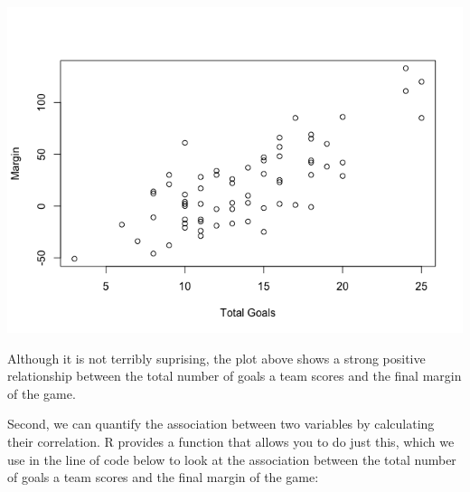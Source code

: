 \documentclass[
]{article}
\newenvironment{Shaded}{\begin{snugshade}}{\end{snugshade}}
\newcommand{\AttributeTok}[1]{\textcolor[rgb]{0.77,0.63,0.00}{#1}}
\newcommand{\FunctionTok}[1]{\textcolor[rgb]{0.00,0.00,0.00}{#1}}
\newcommand{\NormalTok}[1]{#1}
\newcommand{\OtherTok}[1]{\textcolor[rgb]{0.56,0.35,0.01}{#1}}
\newcommand{\SpecialCharTok}[1]{\textcolor[rgb]{0.00,0.00,0.00}{#1}}
\newcommand{\StringTok}[1]{\textcolor[rgb]{0.31,0.60,0.02}{#1}}
\begin{document}
\begin{Shaded}
\end{Shaded}

\includegraphics{Preparation_files/figure-gfm/unnamed-chunk-17-1.png}

Although it is not terribly suprising, the plot above shows a strong
positive relationship between the total number of goals a team scores
and the final margin of the game.

Second, we can quantify the association between two variables by
calculating their correlation. R provides a function that allows you to
do just this, which we use in the line of code below to look at the
association between the total number of goals a team scores and the
final margin of the game:

\begin{Shaded}
\end{Shaded}
\end{document}

